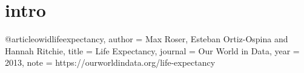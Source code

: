 \section{intro}

@article{owidlifeexpectancy,
    author = {Max Roser, Esteban Ortiz-Ospina and Hannah Ritchie},
    title = {Life Expectancy},
    journal = {Our World in Data},
    year = {2013},
    note = {https://ourworldindata.org/life-expectancy}
}

